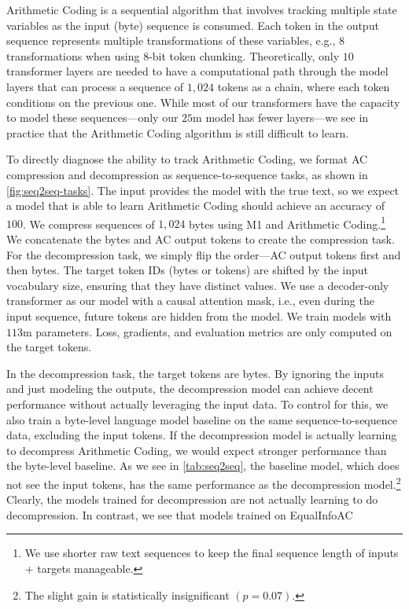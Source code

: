 Arithmetic Coding is a sequential algorithm that involves tracking multiple state variables as the input (byte) sequence is consumed. Each token in the output sequence represents multiple transformations of these variables, e.g., $8$ transformations when using $8$-bit token chunking. Theoretically, only $10$ transformer layers are needed to have a computational path through the model layers that can process a sequence of $1{,}024$ tokens as a chain, where each token conditions on the previous one. While most of our transformers have the capacity to model these sequences---only our $25$m model has fewer layers---we see in practice that the Arithmetic Coding algorithm is still difficult to learn.

To directly diagnose the ability to track Arithmetic Coding, we format AC compression and decompression as sequence-to-sequence tasks, as shown in \ref{fig:seq2seq-tasks}. The input provides the model with the true text, so we expect a model that is able to learn Arithmetic Coding should achieve an accuracy of $100$. We compress sequences of $1{,}024$ bytes using M1 and Arithmetic Coding.\footnote{We use shorter raw text sequences to keep the final sequence length of inputs + targets manageable.} We concatenate the bytes and AC output tokens to create the compression task. For the decompression task, we simply flip the order---AC output tokens first and then bytes. The target token IDs (bytes or tokens) are shifted by the input vocabulary size, ensuring that they have distinct values. We use a decoder-only transformer as our model with a causal attention mask, i.e., even during the input sequence, future tokens are hidden from the model. We train models with $113$m parameters. Loss, gradients, and evaluation metrics are only computed on the target tokens.

In the decompression task, the target tokens are bytes. By ignoring the inputs and just modeling the outputs, the decompression model can achieve decent performance without actually leveraging the input data. To control for this, we also train a byte-level language model baseline on the same sequence-to-sequence data, excluding the input tokens. If the decompression model is actually learning to decompress Arithmetic Coding, we would expect stronger performance than the byte-level baseline. As we see in \ref{tab:seq2seq}, the baseline model, which does not see the input tokens, has the same performance as the decompression model.\footnote{The slight gain is statistically insignificant $(p=0.07)$.} Clearly, the models trained for decompression are not actually learning to do decompression. In contrast, we see that models trained on EqualInfoAC

